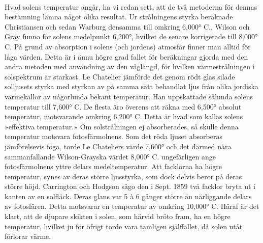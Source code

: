 \documentclass[a4paper, 12pt, oneside, swedish]{article}
\begin{document}
\paragraph{}
Hvad solens temperatur angår, ha vi redan sett, att de två metoderna för dennas bestämning lämna något olika resultat. Ur strålningens styrka beräknade Christiansen och sedan Warburg densamma till omkring 6,000° C., Wilson och Gray funno för solens medelpunkt 6,200°, hvilket de senare korrigerade till 8,000° C. På grund av absorption i solens (och jordens) atmosfär finner man alltid för låga värden. Detta är i ännu högre grad fallet för beräkningar gjorda med den andra metoden med användning av den våglängd, för hvilken värmestrålningen i solspektrum är starkast. Le Chatelier jämförde det genom rödt glas silade solljusets styrka med styrkan av på samma sätt behandlat ljus från olika jordiska värmekällor av någorlunda bekant temperatur. Han uppskattade sålunda solens temperatur till 7,600° C. De flesta äro överens att räkna med 6,500° absolut temperatur, motsvarande omkring 6,200° C. Detta är hvad som kallas solens »effektiva temperatur.» Om solstrålningen ej absorberades, så skulle denna temperatur motsvara fotosfärmolnens. Som det röda ljuset absorberas jämförelsevis föga, torde Le Chateliers värde 7,600° och det därmed nära sammanfallande Wilson-Grayska värdet 8,000° C. ungefärligen ange fotosfärmolnens yttre delars medeltemperatur. Att facklorna ha högre temperatur, synes av deras större ljusstyrka, som dock delvis beror på deras större höjd. Carrington och Hodgson sågo den i Sept. 1859 två facklor bryta ut i kanten av en solfläck. Deras glans var 5 à 6 gånger större än närliggande delars av fotosfären. Detta motsvarar en temperatur av omkring 10,000° C. Häraf är det klart, att de djupare skikten i solen, som härvid bröto fram, ha en högre temperatur, hvilket ju för öfrigt torde vara tämligen själffallet, då solen utåt förlorar värme.
\end{document}
